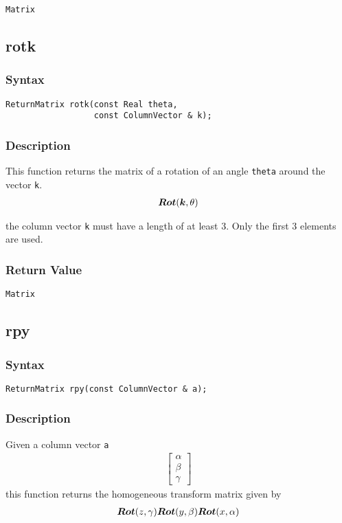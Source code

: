 \documentclass[11pt,fleqn,letterpaper]{report}
\newcommand{\mbold}[1]{\mbox{\boldmath $ #1 $}}
\newcommand{\matr}[2]{\left[\begin{array}{#1} #2 \end{array}\right]}
\begin{document}
{\tt Matrix}

\newpage

\subsection*{rotk}

\subsubsection*{Syntax}
\begin{verbatim}
ReturnMatrix rotk(const Real theta, 
                  const ColumnVector & k);
\end{verbatim}
\subsubsection*{Description}
This function returns the matrix of a rotation of an angle {\tt theta} around 
the vector {\tt k}.
\begin{eqnarray}
\mbold{Rot}(\mbold{k}, \theta)
\end{eqnarray}

 the column vector {\tt k} must have a length of at least 3. 
Only the first 3 elements are used.

\subsubsection*{Return Value}

{\tt Matrix}

\newpage

\subsection*{rpy}
\subsubsection*{Syntax}
\begin{verbatim}
ReturnMatrix rpy(const ColumnVector & a);
\end{verbatim}
\subsubsection*{Description}
Given a column vector {\tt a} 
\begin{eqnarray}
\matr{c}{\alpha \\ \beta \\ \gamma}
\end{eqnarray}
this function returns the homogeneous transform matrix given by 
\begin{eqnarray}
\mbold{Rot}(z,\gamma) \mbold{Rot}(y,\beta) \mbold{Rot}(x,\alpha)
\end{eqnarray}
\end{document}
